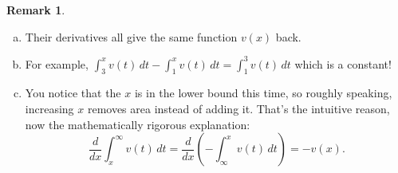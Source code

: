 \documentclass[11pt,oneside]{amsart}
\theoremstyle{definition}
\newtheorem{remark}{Remark}
\begin{document}
\begin{remark}
  \leavevmode\begin{enumerate}[(a)]
    \item Their derivatives all give the same function $v(x)$ back.
    \item For example, $\int_3^x v(t)\,dt-\int_1^x v(t)\,dt=\int_1^3 v(t)\,dt$ which is a constant!
    \item You notice that the $x$ is in the lower bound this time, so roughly speaking, increasing $x$ removes area instead of adding it. That's the intuitive reason, now the mathematically rigorous explanation:
          \[\frac d{dx}\int_x^\infty v(t)\,dt=\frac d{dx}\left(-\int_{\infty}^x v(t)\,dt\right)=-v(x).\]
  \end{enumerate}
\end{remark}
\end{document}
